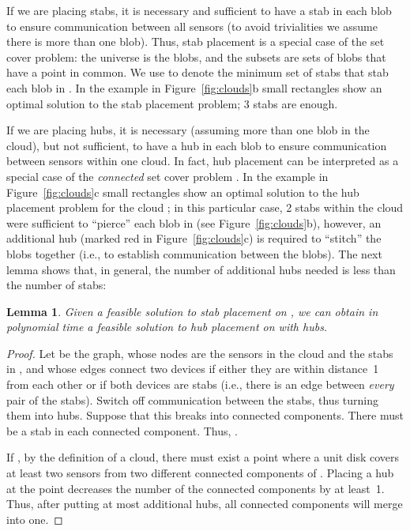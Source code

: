 \documentclass[11pt,a4paper]{article}
\newtheorem{lemma}{Lemma}
\theoremstyle{definition}
\theoremstyle{remark}
\begin{document}
If we are placing stabs, it is necessary and sufficient to have a stab in each blob to ensure communication between all sensors (to avoid trivialities we assume there is more than one blob). Thus, stab placement is a special case of the set cover problem: the universe is the blobs, and the subsets are sets of blobs that have a point in common.  We use  to denote the minimum set of stabs that stab each blob in . In the example in Figure~\ref{fig:clouds}b small rectangles show an optimal solution to the stab placement problem; 3 stabs are enough.

If we are placing hubs, it is necessary (assuming more than one blob in the cloud), but not sufficient, to have a hub in each blob to ensure communication between sensors within one cloud.  In fact, hub placement can be interpreted as a special case of the \emph{connected} set cover problem \cite{cerdeira05requiring,shuai06connected}.  In the example in Figure~\ref{fig:clouds}c small rectangles show an optimal solution to the hub placement problem for the cloud ; in this particular case, 2 stabs within the cloud  were sufficient to ``pierce'' each blob in  (see Figure~\ref{fig:clouds}b), however, an additional hub (marked red in Figure~\ref{fig:clouds}c) is required to ``stitch'' the blobs together (i.e., to establish communication between the blobs). The next lemma shows that, in general, the number of additional hubs needed  is less than the number of stabs:

\begin{lemma}\label{lem_stab2hub}
    Given a feasible solution\/  to stab placement on\/ , we can obtain in polynomial time a feasible solution to hub placement on\/  with\/  hubs.
\end{lemma}

\begin{proof}
    Let  be the graph, whose nodes are the sensors in the cloud  and the stabs in , and whose edges connect two devices if either they are within distance~1 from each other or if both devices are stabs (i.e., there is an edge between \emph{every} pair of the stabs).  Switch off communication between the stabs, thus turning them into hubs.  Suppose that this breaks  into  connected components. There must be a stab in each connected component. Thus, .

    If , by the definition of a cloud, there must exist a point where a unit disk covers at least two sensors from two different connected components of . Placing a hub at the point decreases the number of the connected components by at least~1. Thus, after putting at most  additional hubs, all connected components will merge into one.
\end{proof}
\end{document}

